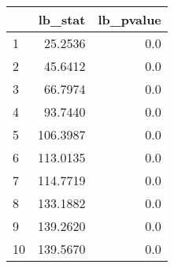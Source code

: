\begin{tabular}{lrr}
\toprule
{} &   lb\_stat &  lb\_pvalue \\
\midrule
1  &   25.2536 &        0.0 \\
2  &   45.6412 &        0.0 \\
3  &   66.7974 &        0.0 \\
4  &   93.7440 &        0.0 \\
5  &  106.3987 &        0.0 \\
6  &  113.0135 &        0.0 \\
7  &  114.7719 &        0.0 \\
8  &  133.1882 &        0.0 \\
9  &  139.2620 &        0.0 \\
10 &  139.5670 &        0.0 \\
\bottomrule
\end{tabular}
